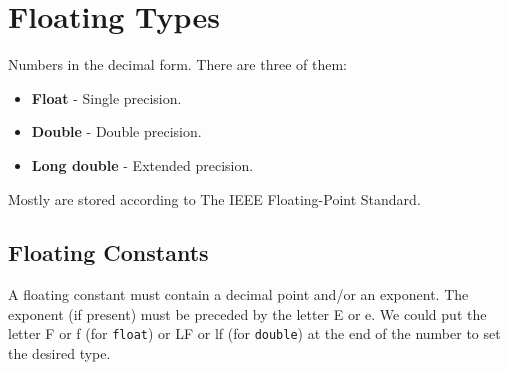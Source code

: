 \documentclass[12pt, openany]{book}
\begin{document}
    \section{Floating Types}
    Numbers in the decimal form. There are three of them:
    \begin{itemize}
        \item \textbf{Float} - Single precision.
        \item \textbf{Double} - Double precision.
        \item \textbf{Long double} - Extended precision.
    \end{itemize}
    Mostly are stored according to The IEEE Floating-Point Standard.

    \subsection*{Floating Constants}
    A floating constant must contain a decimal point and/or an exponent. The exponent
    (if present) must be preceded by the letter E or e. We could put the letter F or f
    (for \texttt{float}) or LF or lf (for \texttt{double}) at the end of the number to
    set the desired type.
\end{document}
